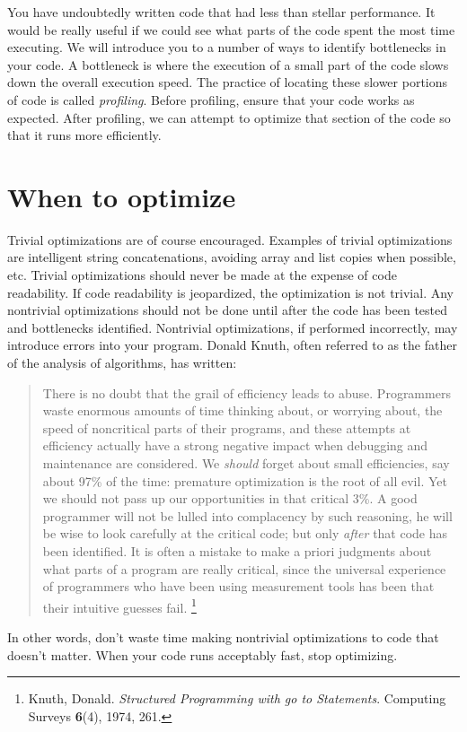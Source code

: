 \label{lab:ProfilingCode}

You have undoubtedly written code that had less than stellar performance.
It would be really useful if we could see what parts of the code spent the most time executing.
We will introduce you to a number of ways to identify bottlenecks in your code.
A bottleneck is where the execution of a small part of the code slows down the overall execution speed.
The practice of locating these slower portions of code is called \emph{profiling}.
Before profiling, ensure that your code works as expected.
After profiling, we can attempt to optimize that section of the code so that it runs more efficiently.

\section*{When to optimize}
Trivial optimizations are of course encouraged.  
Examples of trivial optimizations are intelligent string concatenations, avoiding array and list copies when possible, etc.
Trivial optimizations should never be made at the expense of code readability.
If code readability is jeopardized, the optimization is not trivial.
Any nontrivial optimizations should not be done until after the code has been tested and bottlenecks identified.
Nontrivial optimizations, if performed incorrectly, may introduce errors into your program.
Donald Knuth, often referred to as the father of the analysis of algorithms, has written:
\begin{quote}
There is no doubt that the grail of efficiency leads to abuse.
Programmers waste enormous amounts of time thinking about, or worrying about, the speed of noncritical parts of their programs, and these attempts at efficiency actually have a strong negative impact when debugging and maintenance are considered.
We \emph{should} forget about small efficiencies, say about 97\% of the time: premature optimization is the root of all evil.
Yet we should not pass up our opportunities in that critical 3\%.
A good programmer will not be lulled into complacency by such reasoning, he will be wise to look carefully at the critical code; but only \emph{after} that code has been identified.
It is often a mistake to make a priori judgments about what parts of a program are really critical, since the universal experience of programmers who have been using measurement tools has been that their intuitive guesses fail.
\footnote{Knuth, Donald. \emph{Structured Programming with go to Statements}. Computing Surveys \textbf{6}(4), 1974, 261.}
\end{quote}
In other words, don't waste time making nontrivial optimizations to code that doesn't matter.
When your code runs acceptably fast, stop optimizing.

